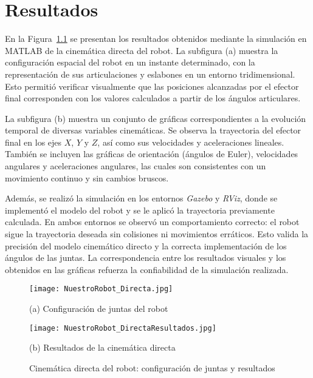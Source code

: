 \chapter{Resultados} \label{chap:resultados}
En la Figura~\ref{fig:CinematicaDirecta} se presentan los resultados obtenidos mediante la simulación en MATLAB de la cinemática directa del robot. La subfigura (a) muestra la configuración espacial del robot en un instante determinado, con la representación de sus articulaciones y eslabones en un entorno tridimensional. Esto permitió verificar visualmente que las posiciones alcanzadas por el efector final corresponden con los valores calculados a partir de los ángulos articulares.

La subfigura (b) muestra un conjunto de gráficas correspondientes a la evolución temporal de diversas variables cinemáticas. Se observa la trayectoria del efector final en los ejes $X$, $Y$ y $Z$, así como sus velocidades y aceleraciones lineales. También se incluyen las gráficas de orientación (ángulos de Euler), velocidades angulares y aceleraciones angulares, las cuales son consistentes con un movimiento continuo y sin cambios bruscos.

Además, se realizó la simulación en los entornos \textit{Gazebo} y \textit{RViz}, donde se implementó el modelo del robot y se le aplicó la trayectoria previamente calculada. En ambos entornos se observó un comportamiento correcto: el robot sigue la trayectoria deseada sin colisiones ni movimientos erráticos. Esto valida la precisión del modelo cinemático directo y la correcta implementación de los ángulos de las juntas. La correspondencia entre los resultados visuales y los obtenidos en las gráficas refuerza la confiabilidad de la simulación realizada.

\begin{figure}[H]
	\centering
	\begin{minipage}[t]{0.49\textwidth}
		\centering
		\texttt{[image: NuestroRobot\_Directa.jpg]}
		\caption*{(a) Configuración de juntas del robot}
	\end{minipage}
	\hfill
	\begin{minipage}[t]{0.49\textwidth}
		\centering
		\texttt{[image: NuestroRobot\_DirectaResultados.jpg]}
		\caption*{(b) Resultados de la cinemática directa}
	\end{minipage}
	\caption{Cinemática directa del robot: configuración de juntas y resultados}
	\label{fig:CinematicaDirecta}
\end{figure}

